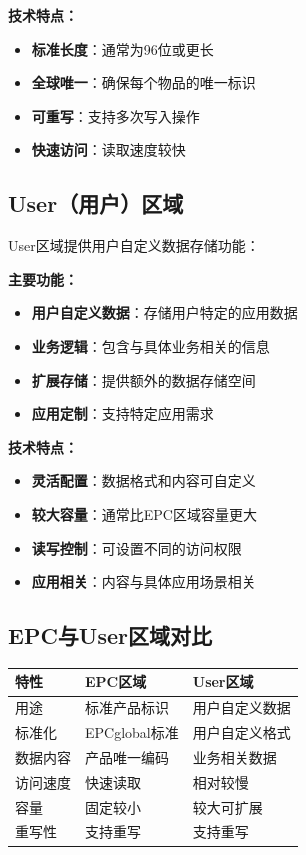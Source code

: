 \documentclass[12pt,UTF8]{ctexbook}
\begin{document}
\begin{itemize}[leftmargin=3.5em]
\begin{itemize}[leftmargin=3.5em]
\textbf{技术特点：}
\begin{itemize}[leftmargin=3.5em]
    \item \textbf{标准长度}：通常为96位或更长
    \item \textbf{全球唯一}：确保每个物品的唯一标识
    \item \textbf{可重写}：支持多次写入操作
    \item \textbf{快速访问}：读取速度较快
\end{itemize}

\subsection{User（用户）区域}

User区域提供用户自定义数据存储功能：

\textbf{主要功能：}
\begin{itemize}[leftmargin=3.5em]
    \item \textbf{用户自定义数据}：存储用户特定的应用数据
    \item \textbf{业务逻辑}：包含与具体业务相关的信息
    \item \textbf{扩展存储}：提供额外的数据存储空间
    \item \textbf{应用定制}：支持特定应用需求
\end{itemize}

\textbf{技术特点：}
\begin{itemize}[leftmargin=3.5em]
    \item \textbf{灵活配置}：数据格式和内容可自定义
    \item \textbf{较大容量}：通常比EPC区域容量更大
    \item \textbf{读写控制}：可设置不同的访问权限
    \item \textbf{应用相关}：内容与具体应用场景相关
\end{itemize}

\subsection{EPC与User区域对比}

\begin{tabular}{|l|l|l|}
\hline
\textbf{特性} & \textbf{EPC区域} & \textbf{User区域} \\
\hline
用途 & 标准产品标识 & 用户自定义数据 \\
\hline
标准化 & EPCglobal标准 & 用户自定义格式 \\
\hline
数据内容 & 产品唯一编码 & 业务相关数据 \\
\hline
访问速度 & 快速读取 & 相对较慢 \\
\hline
容量 & 固定较小 & 较大可扩展 \\
\hline
重写性 & 支持重写 & 支持重写 \\
\hline
\end{tabular}


\end{itemize}
\end{itemize}
\end{document}
